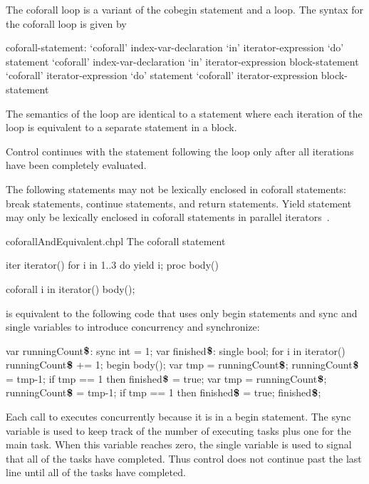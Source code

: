 The coforall loop is a variant of the cobegin statement and a loop.
The syntax for the coforall loop is given by
\begin{syntax}
coforall-statement:
  `coforall' index-var-declaration `in' iterator-expression `do' statement
  `coforall' index-var-declaration `in' iterator-expression block-statement
  `coforall' iterator-expression `do' statement
  `coforall' iterator-expression block-statement
\end{syntax}

The semantics of the  loop are identical to
a  statement where each iteration of the 
loop is equivalent to a separate statement in a  block.

Control continues with the statement following the 
loop only after all iterations have been completely evaluated.

The following statements may not be lexically enclosed in
coforall statements: break statements, continue statements, and
return statements.  Yield statement may only be lexically enclosed in
coforall statements in parallel iterators~.

\begin{chapelexample}{coforallAndEquivalent.chpl}
The coforall statement
\begin{chapelpre}
iter iterator() { for i in 1..3 do yield i; }
proc body() { }
\end{chapelpre}
\begin{chapel}
coforall i in iterator() {
  body();
}
\end{chapel}
is equivalent to the following code that uses only begin statements
and sync and single variables to introduce concurrency and
synchronize:
\begin{chapel}
var runningCount$\mbox{{\bf \$}}$: sync int = 1;
var finished$\mbox{{\bf \$}}$: single bool;
for i in iterator() {
  runningCount$\mbox{{\bf \$}}$ += 1;
  begin {
    body();
    var tmp = runningCount$\mbox{{\bf \$}}$;
    runningCount$\mbox{{\bf \$}}$ = tmp-1;
    if tmp == 1 then finished$\mbox{{\bf \$}}$ = true;
  }
}
var tmp = runningCount$\mbox{{\bf \$}}$;
runningCount$\mbox{{\bf \$}}$ = tmp-1;
if tmp == 1 then finished$\mbox{{\bf \$}}$ = true;
finished$\mbox{{\bf \$}}$;
\end{chapel}
\begin{chapeloutput}
\end{chapeloutput}
Each call to  executes concurrently because it is in a
begin statement.  The sync
variable  is used to keep track of
the number of executing tasks plus one for the main task.  When this
variable reaches zero, the single
variable  is used to signal that all
of the tasks have completed.  Thus control does not continue past the
last line until all of the tasks have completed.
\end{chapelexample}


